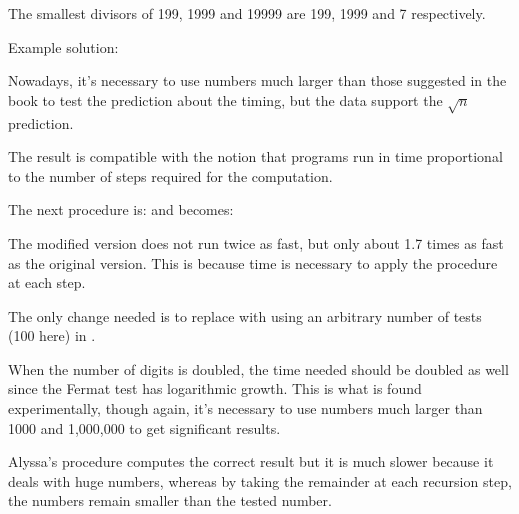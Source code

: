 \begin{exe} %
    The smallest divisors of 199, 1999 and 19999 are 199, 1999 and 
    7 respectively.
\end{exe}

\begin{exe} %
    Example solution:

    Nowadays, it’s necessary to use numbers much larger than those suggested in 
    the book to test the prediction about the timing, but the data support the 
    $\sqrt{n}$ prediction.

    The result is compatible with the notion that programs run in time 
    proportional to the number of steps required for the computation.
\end{exe}

\begin{exe} %
    The next procedure is:
    and  becomes:

    The modified version does not run twice as fast, but only about 1.7 times 
    as fast as the original version. This is because time is necessary to 
    apply the  procedure at each step.
\end{exe}

\begin{exe} %
    The only change needed is to replace  with  
    using an arbitrary number of tests (100 here) in .

    When the number of digits is doubled, the time needed should be doubled as 
    well since the Fermat test has logarithmic growth. This is what is found 
    experimentally, though again, it’s necessary to use numbers much larger 
    than 1000 and 1,000,000 to get significant results.
\end{exe}

\begin{exe} %
    Alyssa’s procedure computes the correct result but it is much slower 
    because it deals with huge numbers, whereas by taking the remainder at 
    each recursion step, the numbers remain smaller than the tested number.
\end{exe}

